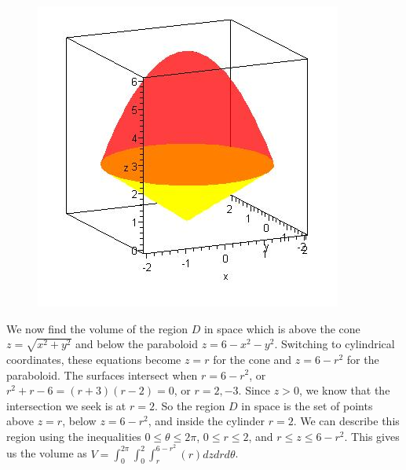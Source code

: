 \begin{figure}
\newcommand{\myheight}{.8in}
\includegraphics[height=\myheight]{10-SurfaceTripleIntegrals/support/cylindrical-1}
\end{figure}
We now find the volume of the region $D$ in space which is above the
cone $z=\sqrt{x^2+y^2}$ and below the paraboloid $z=6-x^2-y^2$.
Switching to cylindrical coordinates, these equations become $z=r$ for
the cone and $z=6-r^2$ for the paraboloid.  The surfaces intersect
when $r=6-r^2$, or $r^2+r-6 = (r+3)(r-2)=0$, or $r=2,-3$. Since $z>0$,
we know that the intersection we seek is at $r=2$. So the region $D$
in space is the set of points above $z=r$, below $z=6-r^2$, and inside
the cylinder $r=2$.  We can describe this region using the
inequalities $0\leq \theta\leq 2\pi$, $0\leq r\leq 2$, and $r\leq z\leq 6-r^2$. This gives us
the volume as $V = \int_0^{2\pi}\int_0^2\int_r^{6-r^2}(r)dzdrd\theta$. 

